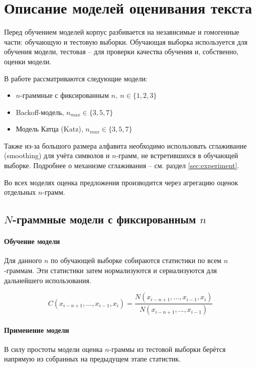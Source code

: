 \section{ Описание моделей оценивания текста }\label{sec:models}

Перед обучением моделей корпус разбивается на независимые и гомогенные части: обучающую и тестовую выборки. Обучающая выборка используется для обучения модели, тестовая -- для проверки качества обучения и, собственно, оценки модели.

В работе рассматриваются следующие модели: 

\begin{itemize}
	\item $n$-граммные с фиксированным $n,\ n \in \{1,2,3\}$
	
	\item Backoff-модель, $n_{max} \in \{ 3, 5, 7 \}$
	
	\item Модель Катца (Katz),  $n_{max} \in \{ 3, 5, 7 \}$
\end{itemize}

Также из-за большого размера алфавита необходимо использовать сглаживание (smoothing) для учёта символов и $n$-грамм, не встретившихся в обучающей выборке. Подробнее о механизме сглаживания -- см. раздел \cref{sec:experiment}.

Во всех моделях оценка предложения производится через агрегацию оценок отдельных $n$-грамм.

\subsection{ $N$-граммные модели с фиксированным $n$ }

\paragraph{ Обучение модели } Для данного $n$ по обучающей выборке собираются статистики по всем $n$-граммам. Эти статистики затем нормализуются и сериализуются для дальнейшего использования.

$$ C(x_{i - n + 1}, ..., x_{i - 1}, x_i) = \dfrac{N(x_{i - n + 1}, ..., x_{i - 1}, x_i)}{N(x_{i - n + 1}, ..., x_{i - 1})} $$ 

\paragraph{ Применение модели } В силу простоты модели оценка $n$-граммы из тестовой выборки берётся напрямую из собранных на предыдущем этапе статистик.

